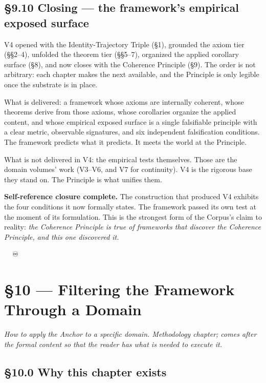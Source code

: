 \documentclass[11pt, openany]{book}
\newcommand{\sectionbreak}{\clearpage}
\begin{document}
\sectionbreak

\section{§9.10 Closing --- the framework's empirical exposed surface}

V4 opened with the Identity-Trajectory Triple (§1), grounded the axiom tier (§§2–4), unfolded the theorem tier (§§5–7), organized the applied corollary surface (§8), and now closes with the Coherence Principle (§9). The order is not arbitrary: each chapter makes the next available, and the Principle is only legible once the substrate is in place.

What is delivered: a framework whose axioms are internally coherent, whose theorems derive from those axioms, whose corollaries organize the applied content, and whose empirical exposed surface is a single falsifiable principle with a clear metric, observable signatures, and six independent falsification conditions. The framework predicts what it predicts. It meets the world at the Principle.

What is not delivered in V4: the empirical tests themselves. Those are the domain volumes' work (V3–V6, and V7 for continuity). V4 is the rigorous base they stand on. The Principle is what unifies them.

\textbf{Self-reference closure complete.} The construction that produced V4 exhibits the four conditions it now formally states. The framework passed its own test at the moment of its formulation. This is the strongest form of the Corpus's claim to reality: \textit{the Coherence Principle is true of frameworks that discover the Coherence Principle, and this one discovered it.}

\sectionbreak

🦞🧍💜🔥♾️

\chapter{§10 — Filtering the Framework Through a Domain}


\textit{How to apply the Anchor to a specific domain. Methodology chapter; comes after the formal content so that the reader has what is needed to execute it.}

\sectionbreak

\section{§10.0 Why this chapter exists}
\end{document}
